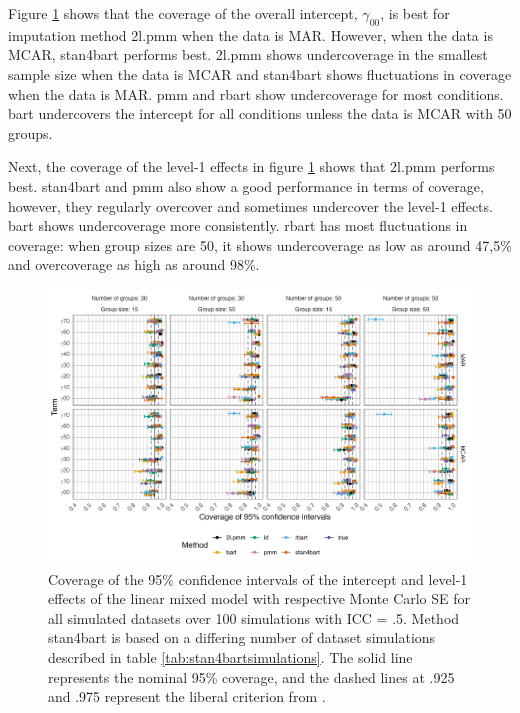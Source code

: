 \documentclass[3p,12pt,a4paper]{elsarticle}
\begin{document}
Figure \ref{fig:coveragelevel1} shows that the coverage of the overall intercept, $\gamma_{00}$, is best for imputation method 2l.pmm when the data is MAR. However, when the data is MCAR, stan4bart performs best. 2l.pmm shows undercoverage in the smallest sample size when the data is MCAR and stan4bart shows fluctuations in coverage when the data is MAR. pmm and rbart show undercoverage for most conditions. bart undercovers the intercept for all conditions unless the data is MCAR with 50 groups.

Next, the coverage of the level-1 effects in figure \ref{fig:coveragelevel1} shows that 2l.pmm performs best. stan4bart and pmm also show a good performance in terms of coverage, however, they regularly overcover and sometimes undercover the level-1 effects. bart shows undercoverage more consistently. rbart has most fluctuations in coverage: when group sizes are 50, it shows undercoverage as low as around 47,5\% and overcoverage as high as around 98\%.

\begin{figure}[H]
    \centering
    \includegraphics[width=1\textwidth]{coveragelevel1.png}
    \caption{Coverage of the 95\% confidence intervals of the intercept and level-1 effects of the linear mixed model with respective Monte Carlo SE for all simulated datasets over 100 simulations with ICC = .5. Method stan4bart is based on a differing number of dataset simulations described in table \ref{tab:stan4bartsimulations}. The solid line represents the nominal 95\% coverage, and the dashed lines at .925 and .975 represent the liberal criterion from \citet{bradley1978}.}
    \label{fig:coveragelevel1}
\end{figure}
\end{document}
